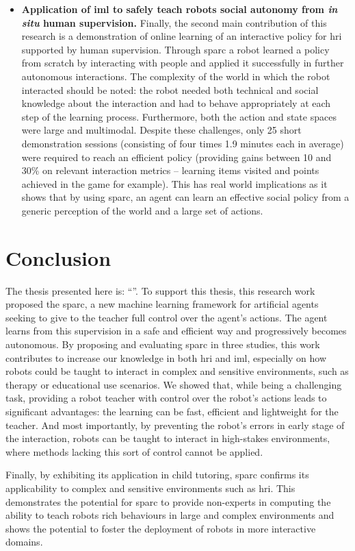 \begin{itemize}
	\item \textbf{Application of \gls{iml} to safely teach robots social autonomy from \textit{in situ} human supervision.} Finally, the second main contribution of this research is a demonstration of online learning of an interactive policy for \gls{hri} supported by human supervision. Through \gls{sparc} a robot learned a policy from scratch by interacting with people and applied it successfully in further autonomous interactions. The complexity of the world in which the robot interacted should be noted: the robot needed both technical and social knowledge about the interaction and had to behave appropriately at each step of the learning process. Furthermore, both the action and state spaces were large and multimodal. Despite these challenges, only 25 short demonstration sessions (consisting of four times 1.9 minutes each in average) were required to reach an efficient policy (providing gains between 10 and 30\% on relevant interaction metrics -- learning items visited and points achieved in the game for example). This has real world implications as it shows that by using \gls{sparc}, an agent can learn an effective social policy from a generic perception of the world and a large set of actions. 
	
\end{itemize}

\section{Conclusion}\label{sec:conc_conc}

The thesis presented here is: ``\thesis''.
To support this thesis, this research work proposed the \acrfull{sparc}, a new machine learning framework for artificial agents seeking to give to the teacher full control over the agent's actions. The agent learns from this supervision in a safe and efficient way and progressively becomes autonomous. By proposing and evaluating \gls{sparc} in three studies, this work contributes to increase our knowledge in both \gls{hri} and \gls{iml}, especially on how robots could be taught to interact in complex and sensitive environments, such as therapy or educational use scenarios. We showed that, while being a challenging task, providing a robot teacher with control over the robot's actions leads to significant advantages: the learning can be fast, efficient and lightweight for the teacher. And most importantly, by preventing the robot's errors in early stage of the interaction, robots can be taught to interact in high-stakes environments, where methods lacking this sort of control cannot be applied.

Finally, by exhibiting its application in child tutoring, \gls{sparc} confirms its applicability to complex and sensitive environments such as \gls{hri}. This demonstrates the potential for \gls{sparc} to provide non-experts in computing the ability to teach robots rich behaviours in large and complex environments and shows the potential to foster the deployment of robots in more interactive domains.